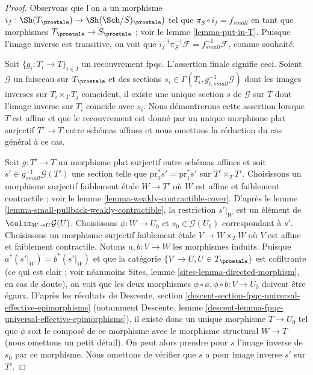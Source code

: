 \begin{proof}
Observons que l'on a un morphisme
$i_f : \Sh(T_\proetale) \to \Sh(\Sch/S)_\proetale)$
tel que $\pi_S \circ i_f = f_{small}$ en tant que morphismes
$T_\proetale \to S_\proetale$ ; voir le lemme \ref{lemma-put-in-T}.
Puisque l'image inverse est transitive, on voit que
$i_f^{-1} \pi_S^{-1}\mathcal{F} = f_{small}^{-1}\mathcal{F}$, comme souhaité.

\medskip\noindent
Soit $\{g_i : T_i \to T\}_{i \in I}$ un recouvrement fpqc. L'assertion finale
signifie ceci. Soient $\mathcal{G}$ un faisceau sur $T_\proetale$ et
des sections $s_i \in \Gamma(T_i, g_{i, small}^{-1}\mathcal{G})$ dont les images inverses
sur $T_i \times_T T_j$ coïncident, il existe une unique section $s$ de $\mathcal{G}$
sur $T$ dont l'image inverse sur $T_i$ coïncide avec $s_i$. Nous démontrerons cette
assertion lorsque $T$ est affine et que le recouvrement est donné par un unique
morphisme plat surjectif $T' \to T$ entre schémas affines et nous omettons la réduction
du cas général à ce cas.

\medskip\noindent
Soit $g : T' \to T$ un morphisme plat surjectif entre schémas affines et soit
$s' \in g_{small}^{-1}\mathcal{G}(T')$ une section telle que
$\text{pr}_0^*s' = \text{pr}_1^*s'$ sur $T' \times_T T'$.
Choisissons un morphisme surjectif faiblement \'etale $W \to T'$ où
$W$ est affine et faiblement contractile ; voir le
lemme \ref{lemma-weakly-contractible-cover}. D'après le
lemme \ref{lemma-small-pullback-weakly-contractible},
la restriction $s'|_W$ est un élément de $\colim_{W \to U} \mathcal{G}(U)$.
Choisissons $\phi : W \to U_0$ et $s_0 \in \mathcal{G}(U_0)$ correspondant à $s'$.
Choisissons un morphisme surjectif faiblement \'etale $V \to W \times_T W$ où
$V$ est affine et faiblement contractile.
Notons $a, b : V \to W$ les morphismes induits.
Puisque $a^*(s'|_W) = b^*(s'|_W)$ et que la catégorie
$\{V \to U, U \in T_\proetale\}$ est cofiltrante
(ce qui est clair ; voir néanmoins
Sites, lemme \ref{sites-lemma-directed-morphism}, en cas de doute),
on voit que les deux morphismes $\phi \circ a , \phi \circ b : V \to U_0$
doivent être égaux. D'après les résultats de
Descente, section \ref{descent-section-fpqc-universal-effective-epimorphisms}
(notamment
Descente, lemme \ref{descent-lemma-fpqc-universal-effective-epimorphisms}),
il existe donc un unique morphisme $T \to U_0$ tel que $\phi$
soit le composé de ce morphisme avec le morphisme structural $W \to T$
(nous omettons un petit détail). On peut alors prendre pour $s$ l'image inverse
de $s_0$ par ce morphisme. Nous omettons de vérifier que
$s$ a pour image inverse $s'$ sur $T'$.
\end{proof}









